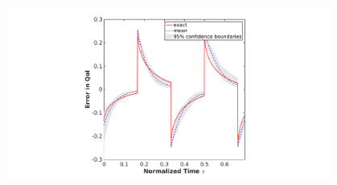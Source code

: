 \documentclass[8pt]{beamer}
\begin{document}
\begin{frame}
\begin{columns}
\begin{column}{.48\textwidth}
\end{column}
\begin{column}{.48\textwidth}
\begin{center}
\vspace{-4mm}
\begin{figure}[h]
    \centering
    \includegraphics[trim = 4in 0.1in 4in 0.1in, clip, width=1\textwidth]{figs_report/error_bound.png} 
\end{figure}
\end{center}
\end{column}
\end{columns}
\vspace{2mm}

\vfill
\end{frame}
\end{document}

